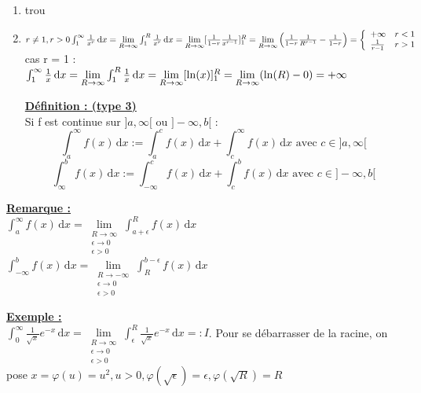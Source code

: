 \documentclass[12pt,a4paper]{article}
\newcommand{\limite}{\lim\limits_}
\newcommand{\evid}[1]{\textbf{\underline{#1}}}
\newcommand{\intx}[3]{\ensuremath{\int_{#1}^{#2} #3 \, \mathrm dx}}
\begin{document}
{\begin{enumerate}
	\item {trou}
	\item $r \neq 1, r > 0 \intx{1}{\infty}{\frac{1}{x^r}} = \limite{R \to \infty}\intx{1}{R}{\frac{1}{x^r}} = \limite{R \to \infty} [\frac{1}{1-r} \frac{1}{x^{r-1}}]_1^R \\
	= \limite{R\to\infty}\left(\frac{1}{1-r}\frac{1}{R^{r-1}} - \frac{1}{1-r}\right) = \left\{
	\begin{array}{ll}
	+\infty & r < 1\\
	\frac{1}{r-1} & r > 1
	\end{array}\right.$\\
	cas r = 1 : $ \intx{1}{\infty}{\frac{1}{x}} = \limite{R \to \infty} \intx{1}{R}{\frac{1}{x}}\\
	 = \limite{R \to \infty}[\ln(x)]_1^R = \limite{R \to \infty}(\ln(R) - 0) = +\infty$
	 \begin{boite}
	 	\evid{Définition : (type 3)}\\
	 	Si f est continue sur $]a,\infty[$ ou $]-\infty,b[$ :
	 	\begin{equation}
	 		\intx{a}{\infty}{f(x)} := \intx{a}{c}{f(x)} + \intx{c}{\infty}{f(x)}\text{ avec } c \in ]a,\infty[
	 	\end{equation}
	 	\begin{equation}
	 		\intx{\infty}{b}{f(x)} := \intx{-\infty}{c}{f(x)} + \intx{c}{b}{f(x)} \text{ avec } c \in ]-\infty,b[
	 	\end{equation}
	 \end{boite}
\end{enumerate} 
\begin{boite}
\evid{Remarque :}\\
$\intx{a}{\infty}{f(x)} = \limite{\substack{R \to \infty \\ \epsilon \to 0 \\ \epsilon > 0}} \intx{a+\epsilon}{R}{f(x)}$\\
$\intx{-\infty}{b}{f(x)} = \limite{\substack{R \to -\infty \\ \epsilon \to 0 \\ \epsilon > 0}}
\intx{R}{b-\epsilon}{f(x)}$
\end{boite}
\evid{Exemple : }\\
$\intx{0}{\infty}{\frac{1}{\sqrt{x}}e^{-x}} = \limite{\substack{R \to \infty \\ \epsilon \to 0 \\ \epsilon > 0}} \intx{\epsilon}{R}{\frac{1}{\sqrt{x}} e^{-x}} =: I$. Pour se débarrasser de la racine, on pose $x = \varphi(u)= u^2, u > 0, \varphi(\sqrt{\epsilon}) = \epsilon, \varphi(\sqrt{R}) = R$\\
}
\end{document}
